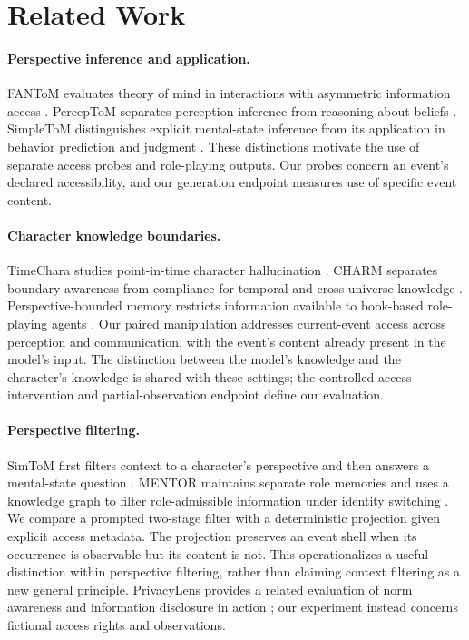\section{Related Work}
\paragraph{Perspective inference and application.}
FANToM evaluates theory of mind in interactions with asymmetric information access \citep{kim-etal-2023-fantom}. PercepToM separates perception inference from reasoning about beliefs \citep{jung-etal-2024-perceptions}. SimpleToM distinguishes explicit mental-state inference from its application in behavior prediction and judgment \citep{gu2026simpletom}. These distinctions motivate the use of separate access probes and role-playing outputs. Our probes concern an event's declared accessibility, and our generation endpoint measures use of specific event content.

\paragraph{Character knowledge boundaries.}
TimeChara studies point-in-time character hallucination \citep{ahn-etal-2024-timechara}. CHARM separates boundary awareness from compliance for temporal and cross-universe knowledge \citep{han2026charm}. Perspective-bounded memory restricts information available to book-based role-playing agents \citep{tang2026staying}. Our paired manipulation addresses current-event access across perception and communication, with the event's content already present in the model's input. The distinction between the model's knowledge and the character's knowledge is shared with these settings; the controlled access intervention and partial-observation endpoint define our evaluation.

\paragraph{Perspective filtering.}
SimToM first filters context to a character's perspective and then answers a mental-state question \citep{wilf-etal-2024-think}. MENTOR maintains separate role memories and uses a knowledge graph to filter role-admissible information under identity switching \citep{zhu2026mentor}. We compare a prompted two-stage filter with a deterministic projection given explicit access metadata. The projection preserves an event shell when its occurrence is observable but its content is not. This operationalizes a useful distinction within perspective filtering, rather than claiming context filtering as a new general principle. PrivacyLens provides a related evaluation of norm awareness and information disclosure in action \citep{shao2024privacylens}; our experiment instead concerns fictional access rights and observations.


